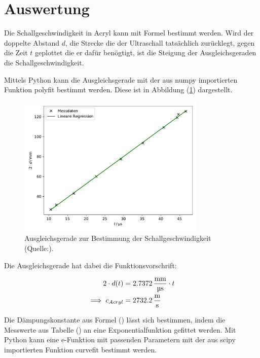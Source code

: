 \newpage
\section{Auswertung}
Die Schallgeschwindigkeit in Acryl kann mit Formel %
bestimmt werden.
Wird der doppelte Abstand $d$, die Strecke die der Ultraschall tatsächlich zurücklegt,
gegen die Zeit $t$ geplottet die er dafür benögtigt, ist die Steigung der Ausgleichsgeraden
die Schallgeschwindigkeit.

\noindent
Mittels Python kann die Ausgleichsgerade mit der aus numpy \cite{numpy} importierten Funktion polyfit bestimmt werden.
Diese ist in Abbildung (\ref{fig:schall}) dargestellt.

\begin{figure}
    \centering
    \includegraphics[width=9cm]{schall.pdf}
    \caption{Ausgleichsgerade zur Bestimmung der Schallgeschwindigkeit (Quelle:\cite{US1}).}
    \label{fig:schall}
  \end{figure}
  
\noindent
Die Ausgleichsgerade hat dabei die Funktionsvorschrift:

\begin{align*}
2 \cdot d(t) &= 2.7372 \, \si[per-mode=fraction]{\milli\meter\per\micro\second} \cdot t \\
\implies c_{Acryl} &= 2732.2 \, \si[per-mode=fraction]{\meter\per\second} \\
\end{align*}

\noindent
Die Dämpungskonstante aus Formel () lässt sich bestimmen, indem die Messwerte aus Tabelle () an eine Exponentialfunktion gefittet werden.
Mit Python kann eine e-Funktion mit passenden Parametern mit der aus scipy \cite{scipy} importierten Funktion curvefit bestimmt werden.

